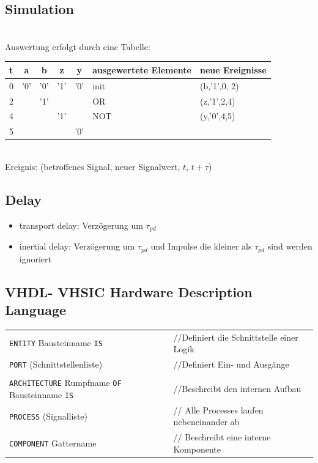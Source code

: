 \documentclass[6pt,a4paper]{scrartcl}
\begin{document}
\begin{multicols}{3}
	\subsection{Simulation}
	\\
	Auswertung erfolgt durch eine Tabelle:\\
 	\begin{tabular}{l|cccc|l|l}
		t& a &b &z &y& ausgewertete Elemente & neue Ereignisse\\ \midrule
		0& '0' & '0' & '1'& '0' & init & (b,'1',0, 2) \\
		2& & '1' & & & OR & (z,'1',2,4) \\
		4& & & '1' & & NOT & (y,'0',4,5)\\
		5& & & & '0' &  & \\
	\end{tabular}
	\\
	Ereignis: (betroffenes Signal, neuer Signalwert, $t$, $t+\tau$)

	\subsection{Delay}
	\begin{itemize}
		\item transport delay: Verzögerung um $\tau_{pd} $
		\item inertial delay: Verzögerung um $\tau_{pd}$ und Impulse die kleiner als $\tau_{pd}$ sind werden ignoriert
	\end{itemize}


	\subsection{VHDL- VHSIC Hardware Description Language}
	\begin{tabular}{ll}
	\texttt{ENTITY} Bausteinname  \texttt{IS}	& //Definiert die Schnittstelle einer Logik\\
	\texttt{PORT} (Schnittstellenliste) & //Definiert Ein- und Ausgänge\\
	\\
	\texttt{ARCHITECTURE} Rumpfname \texttt{OF} Bausteinname \texttt{IS} & //Beschreibt den internen Aufbau\\
	\texttt{PROCESS} (Signalliste) & // Alle Processes laufen nebeneinander ab\\
	\texttt{COMPONENT} Gattername & // Beschreibt eine interne Komponente\\
	\end{tabular}


\end{multicols}
\end{document}
